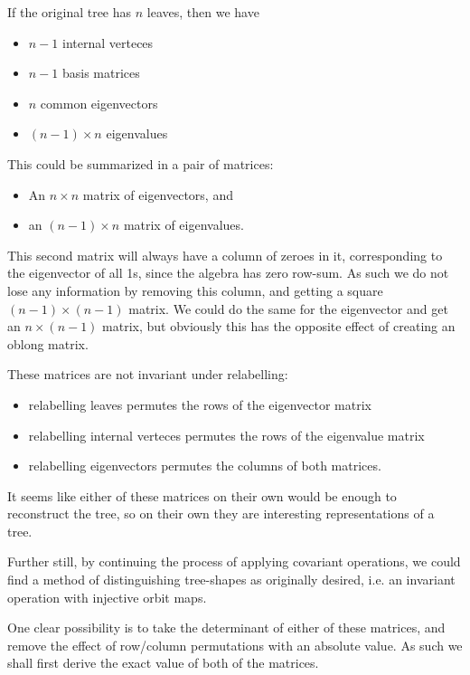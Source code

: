 \documentclass[10pt,a4paper]{report}
\begin{document}
If the original tree has $n$ leaves, then we have
\begin{itemize}
	\item $n-1$ internal verteces
	\item $n-1$ basis matrices
	\item $n$ common eigenvectors
	\item $(n-1) \times n$ eigenvalues
\end{itemize}

This could be summarized in a pair of matrices:
\begin{itemize}
	\item An $n \times n$ matrix of eigenvectors, and
	\item an $(n-1) \times n$ matrix of eigenvalues.
\end{itemize}

This second matrix will always have a column of zeroes in it, corresponding to
the eigenvector of all 1s, since the algebra has zero row-sum.
As such we do not lose any information by removing this column, and getting a
square $(n-1) \times (n-1)$ matrix.
We could do the same for the eigenvector and get an $n \times (n-1)$ matrix,
but obviously this has the opposite effect of creating an oblong matrix.

These matrices are not invariant under relabelling:
\begin{itemize}
	\item relabelling leaves permutes the rows of the eigenvector matrix
	\item relabelling internal verteces permutes the rows of the eigenvalue matrix
	\item relabelling eigenvectors permutes the columns of both matrices.
\end{itemize}

It seems like either of these matrices on their own would be enough to
reconstruct the tree, so on their own they are interesting representations of a tree.

Further still, by continuing the process of applying covariant operations, we could find a method of distinguishing tree-shapes as originally desired, i.e. an invariant operation with injective orbit maps.

One clear possibility is to take the determinant of either of these matrices,
and remove the effect of row/column permutations with an absolute value.
As such we shall first derive the exact value of both of the matrices.

\end{document}
